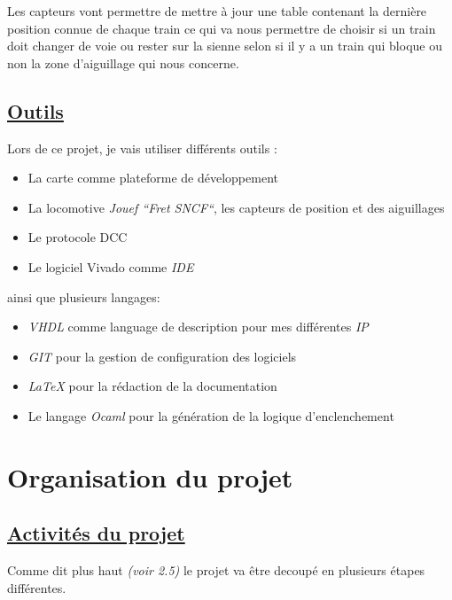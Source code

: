 Les capteurs vont permettre de mettre à jour une table contenant la
dernière position connue de chaque train ce qui va nous permettre de
choisir si un train doit changer de voie ou rester sur la sienne selon
si il y a un train qui bloque ou non la zone d'aiguillage qui nous concerne.


\subsection{\underline{Outils}}
\label{sec:outils}

Lors de ce projet, je vais utiliser diff\'erents outils :
\begin{itemize}
  \item La carte \crt comme plateforme de d\'eveloppement
  \item La locomotive \emph{Jouef ``Fret SNCF``}\cite{Jouef}, les capteurs de
    position et des aiguillages
  \item Le protocole DCC \cite{DCC}
  \item Le logiciel Vivado comme \emph{IDE}
\end{itemize}

ainsi que plusieurs langages:
\begin{itemize}
  \item \emph{VHDL}\cite{VHDL} comme language de description pour mes diff\'erentes
    \emph{IP}
  \item \emph{GIT}\cite{GIT} pour la gestion de configuration des logiciels
  \item \emph{\LaTeX}\cite{LATEX} pour la r\'edaction de la documentation
  \item Le langage \emph{Ocaml}\cite{OCAML} pour la g\'en\'eration de la logique d'enclenchement
\end{itemize}

\newpage
\section{Organisation du projet}
\label{sec:org_proj}

\subsection{\underline{Activit\'es du projet}}
\label{sec:activ}

Comme dit plus haut \emph{(voir 2.5)} le projet va \^etre decoup\'e en
plusieurs \'etapes diff\'erentes.

